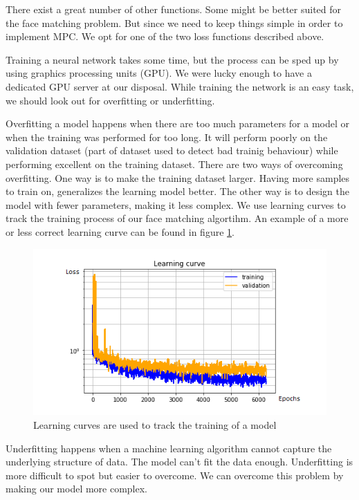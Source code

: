 There exist a great number of other functions. Some might be better suited for the face matching problem. But since we need to keep things simple in order to implement MPC. We opt for one of the two loss functions described above.

Training a neural network takes some time, but the process can be sped up by using graphics processing units (GPU). We were lucky enough to have a dedicated GPU server at our disposal. While training the network is an easy task, we should look out for overfitting or underfitting.

Overfitting a model happens when there are too much parameters for a model or when the training was performed for too long. It will perform poorly on the validation dataset (part of dataset used to detect bad trainig behaviour) while performing excellent on the training dataset. There are two ways of overcoming overfitting. One way is to make the training dataset larger. Having more samples to train on, generalizes the learning model better. The other way is to design the model with fewer parameters, making it less complex. We use learning curves to track the training process of our face matching algortihm. An example of a more or less correct learning curve can be found in figure \ref{fig:trainingcurve}.

\begin{figure}[H]
  \includegraphics{fig/trainingcurve.png}
  \caption{Learning curves are used to track the training of a model}
  \label{fig:trainingcurve}
\end{figure}

Underfitting happens when a machine learning algorithm cannot capture the underlying structure of data. The model can't fit the data enough. Underfitting is more difficult to spot but easier to overcome. We can overcome this problem by making our model more complex.

